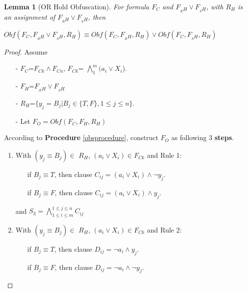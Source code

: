 \documentclass[conference]{IEEEtran}
\newtheorem{lemma}{\textbf{Lemma}}
\begin{document}
\begin{lemma}[OR Hold Obfuscation]\label{ORrelation-Holding-Obfuscation}
For formula $F_C$ and $F_{_RH}\vee F_{_SH}$, with $R_H$ is an assignment of $F_{_RH} \vee F_{_SH}$,
then

$Obf(F_C,F_{_RH}\vee F_{_SH},R_H)\equiv Obf(F_C,F_{_RH},R_H) \vee Obf(F_C,F_{_SH},R_H)$
\end{lemma}
\begin{proof}
Assume
\begin{enumerate}
 \item[-]$F_C$=$F_{Ck} \wedge F_{Cn}$,  $F_{Ck}$= $\bigwedge_{1}^{m}(a_i\vee X_i$).  
 \item[-]$F_H$=$F_{_RH}\vee F_{_SH}$
 \item[-]$R_H$=$\{y_j=B_j| B_j \in \{T,F\}, 1\leqslant j\leqslant n\}$.
 \item[-]Let $F_O=Obf(F_C,F_H,R_H)$
 \end{enumerate}
According to \textbf{Procedure} \ref{obsprocedure}, construct $F_O$ as following 3 \textbf{steps}.
\begin{enumerate}
\item With $(y_j\equiv B_j)\in$ $R_H$, $(a_i\vee X_i) \in F_{Ck}$ and Rule 1:
\begin{itemize}
 \item[] if $B_j\equiv T$, then clause $C_{ij}=(a_i\vee X_i)\wedge \neg y_j$.
 \item[] if $B_j\equiv F$, then clause $C_{ij}=(a_i\vee X_i)\wedge y_j$.
\end{itemize}
and $S_3=\bigwedge_{1\leqslant i\leqslant m}^{1\leqslant j\leqslant n} C_{ij}$
\item
With $(y_j\equiv  B_j)\in $ $R_H$, $(a_i\vee X_i) \in F_{Ck}$ and Rule 2:
\begin{itemize}
 \item[] if $B_j\equiv T$, then clause $D_{ij}=\neg a_i\wedge y_j$.
 \item[] if $B_j\equiv F$, then clause $D_{ij}=\neg a_i\wedge \neg y_j$.

\end{itemize}
\end{enumerate}
\end{proof}
\end{document}
